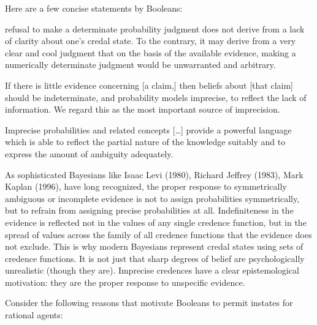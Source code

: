 \documentclass[11pt]{article}
\begin{document}
Here are a few concise statements by Booleans:

\begin{quotex}
  [A] refusal to make a determinate probability judgment does not
  derive from a lack of clarity about one's credal state. To the
  contrary, it may derive from a very clear and cool judgment that on
  the basis of the available evidence, making a numerically
  determinate judgment would be unwarranted and arbitrary.
\end{quotex}

\begin{quotex}
  If there is little evidence concerning [a claim,] then beliefs about
  [that claim] should be indeterminate, and probability models
  imprecise, to reflect the lack of information. We regard this as the
  most important source of imprecision. 
\end{quotex}

\begin{quotex}
  Imprecise probabilities and related concepts [{\ldots}] provide a
  powerful language which is able to reflect the partial nature of the
  knowledge suitably and to express the amount of ambiguity
  adequately. 
\end{quotex}

\begin{quotex}
  As sophisticated Bayesians like Isaac Levi (1980), Richard Jeffrey
  (1983), Mark Kaplan (1996), have long recognized, the proper
  response to symmetrically ambiguous or incomplete evidence is not to
  assign probabilities symmetrically, but to refrain from assigning
  precise probabilities at all. Indefiniteness in the evidence is
  reflected not in the values of any single credence function, but in
  the spread of values across the family of all credence functions
  that the evidence does not exclude. This is why modern Bayesians
  represent credal states using sets of credence functions. It is not
  just that sharp degrees of belief are psychologically unrealistic
  (though they are). Imprecise credences have a clear epistemological
  motivation: they are the proper response to unspecific evidence.
\end{quotex}



Consider the following reasons that motivate Booleans to permit
instates for rational agents:
\end{document}
